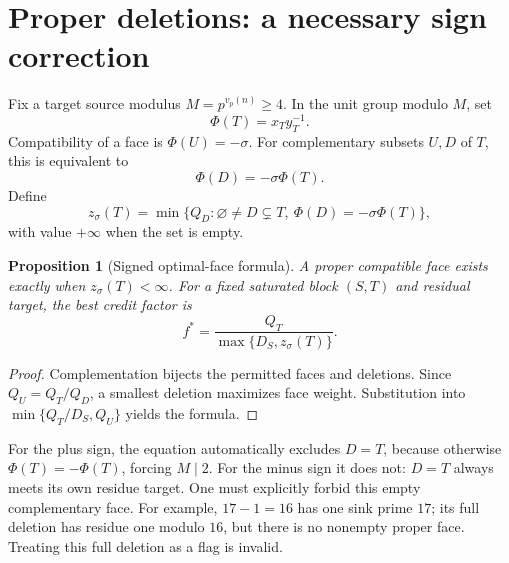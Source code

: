\documentclass[11pt]{article}
\newtheorem{proposition}[theorem]{Proposition}
\theoremstyle{definition}\newtheorem{definition}[theorem]{Definition}
\theoremstyle{remark}\newtheorem{remark}[theorem]{Remark}
\begin{document}
\section{Proper deletions: a necessary sign correction}
Fix a target source modulus \(M=p^{v_p(n)}\ge4\). In the unit group modulo \(M\), set
\[
 \Phi(T)=x_Ty_T^{-1}.
\]
Compatibility of a face is \(\Phi(U)=-\sigma\). For complementary subsets \(U,D\) of \(T\), this is equivalent to
\[
 \Phi(D)=-\sigma\Phi(T).
\]
Define
\[
 z_\sigma(T)=\min\{Q_D:\varnothing\ne D\subsetneq T,
               \ \Phi(D)=-\sigma\Phi(T)\},
\]
with value \(+\infty\) when the set is empty.
\begin{proposition}[Signed optimal-face formula]\label{prop:deletion}
A proper compatible face exists exactly when \(z_\sigma(T)<\infty\). For a fixed saturated block \((S,T)\) and residual target, the best credit factor is
\[
 f^*=\frac{Q_T}{\max\{D_S,z_\sigma(T)\}}.
\]
\end{proposition}
\begin{proof}
Complementation bijects the permitted faces and deletions. Since \(Q_U=Q_T/Q_D\), a smallest deletion maximizes face weight. Substitution into \(\min\{Q_T/D_S,Q_U\}\) yields the formula.
\end{proof}
For the plus sign, the equation automatically excludes \(D=T\), because otherwise \(\Phi(T)=-\Phi(T)\), forcing \(M\mid2\). For the minus sign it does not: \(D=T\) always meets its own residue target. One must explicitly forbid this empty complementary face. For example, \(17-1=16\) has one sink prime \(17\); its full deletion has residue one modulo \(16\), but there is no nonempty proper face. Treating this full deletion as a flag is invalid.
\end{document}
